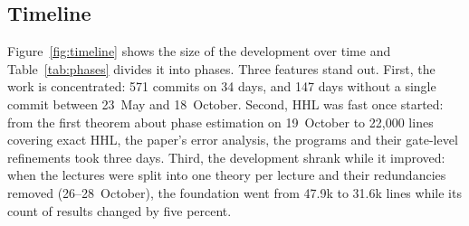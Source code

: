 \subsection{Timeline}

Figure~\ref{fig:timeline} shows the size of the development over time and Table~\ref{tab:phases}
divides it into phases. Three features stand out. First, the work is concentrated: 571 commits on 34
days, and 147 days without a single commit between 23~May and 18~October. Second, HHL was fast once
started: from the first theorem about phase estimation on 19~October to 22{,}000 lines covering exact
HHL, the paper's error analysis, the programs and their gate-level refinements took three days.
Third, the development shrank while it improved: when the lectures were split into one theory
per lecture and their redundancies removed (26--28~October), the foundation went from 47.9k to 31.6k
lines while its count of results changed by five percent.


